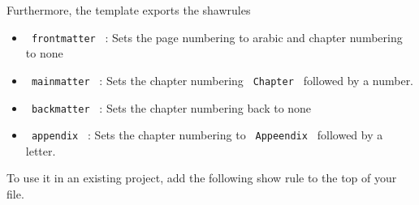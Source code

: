 \begin{Shaded}
\begin{Highlighting}[]
\NormalTok{  ),}
\NormalTok{  ),}
\NormalTok{  ),}
\NormalTok{)}
\end{Highlighting}
\end{Shaded}

Furthermore, the template exports the shawrules

\begin{itemize}
\tightlist
\item
  \texttt{\ frontmatter\ } : Sets the page numbering to arabic and
  chapter numbering to none
\item
  \texttt{\ mainmatter\ } : Sets the chapter numbering
  \texttt{\ Chapter\ } followed by a number.
\item
  \texttt{\ backmatter\ } : Sets the chapter numbering back to none
\item
  \texttt{\ appendix\ } : Sets the chapter numbering to
  \texttt{\ Appeendix\ } followed by a letter.
\end{itemize}

To use it in an existing project, add the following show rule to the top
of your file.

